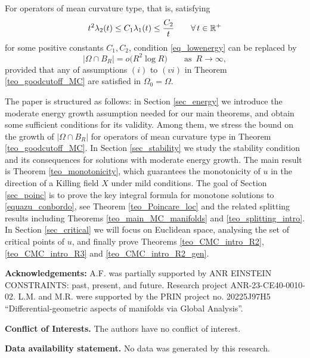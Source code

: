 \documentclass[10 pt,a4paper]{article}
\theoremstyle{definition}
\begin{document}
For operators of mean curvature type, that is, satisfying
\[
t^2 \lambda_2(t) \le C_1 \lambda_1(t) \le \frac{C_2}{t} \qquad \forall \, t \in \mathbb R^+
\]
for some positive constants $C_1,C_2$, condition \eqref{eq_lowenergy} can be replaced by 
\[
|\Omega \cap B_R| = o\big( R^2 \log R \big) \qquad \text{as } \, R \to \infty, 
\]
provided that any of assumptions $(i)$ to $(vi)$ in Theorem \ref{teo_goodcutoff_MC} are satisfied in $\Omega_0 = \Omega$.

\vspace{0.5cm}

The paper is structured as follows: in Section \ref{sec_energy} we introduce the moderate energy growth assumption needed for our main theorems, and obtain some sufficient conditions for its validity. Among them, we stress the bound on the growth of $|\Omega \cap B_R|$ for operators of mean curvature type in Theorem \ref{teo_goodcutoff_MC}. In Section \ref{sec_stability} we study the stability condition and its consequences for solutions with moderate energy growth. The main result is Theorem \ref{teo_monotonicity}, which guarantees the monotonicity of $u$ in the direction of a Killing field $X$ under mild conditions. The goal of Section \ref{sec_poinc} is to prove the key integral formula for monotone solutions to \eqref{equazu_conbordo}, see Theorem \ref{teo_Poincare_loc} and the related splitting results including Theorems \ref{teo_main_MC_manifolds} and \ref{teo_splitting_intro}. In Section \ref{sec_critical} we will focus on Euclidean space, analysing the set of critical points of $u$, and finally prove Theorems \ref{teo_CMC_intro_R2}, \ref{teo_CMC_intro_R3} and \ref{teo_CMC_intro_R2_gen}.
 
\vspace{0.5cm}

\noindent \textbf{Acknowledgements:} A.F. was partially supported by ANR EINSTEIN CONSTRAINTS:
past, present, and future. Research project ANR-23-CE40-0010-02. L.M. and M.R. were supported by the PRIN project no. 20225J97H5 ``Differential-geometric aspects of manifolds via Global Analysis''. 

\vspace{0.2cm}

\noindent \textbf{Conflict of Interests.} The authors have no conflict of interest.
%
\vspace{0.2cm}

\noindent \textbf{Data availability statement.} No data was generated by this research.
\end{document}
